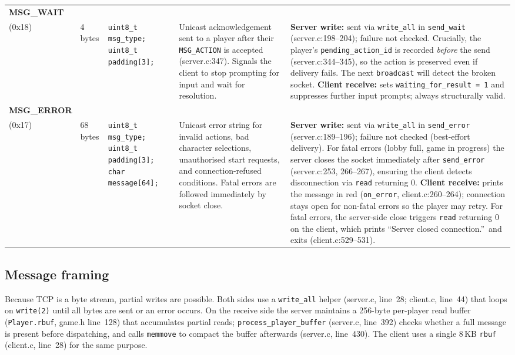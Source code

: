 \documentclass[11pt,letterpaper]{article}
\begin{document}
\begin{longtable}{@{}p{1.8cm} p{1.2cm} p{2.4cm} p{4.2cm} p{4.8cm}@{}}
\textbf{MSG\_WAIT}\\(0x18) &
4 bytes &
\texttt{uint8\_t msg\_type;}\newline
\texttt{uint8\_t padding[3];} &
Unicast acknowledgement sent to a player after their \texttt{MSG\_ACTION} is accepted (server.c:347). Signals the client to stop prompting for input and wait for resolution. &
\textbf{Server write:} sent via \texttt{write\_all} in \texttt{send\_wait} (server.c:198--204); failure not checked. Crucially, the player's \texttt{pending\_action\_id} is recorded \emph{before} the send (server.c:344--345), so the action is preserved even if delivery fails. The next \texttt{broadcast} will detect the broken socket. \textbf{Client receive:} sets \texttt{waiting\_for\_result = 1} and suppresses further input prompts; always structurally valid. \\[4pt]

\textbf{MSG\_ERROR}\\(0x17) &
68 bytes &
\texttt{uint8\_t msg\_type;}\newline
\texttt{uint8\_t padding[3];}\newline
\texttt{char message[64];} &
Unicast error string for invalid actions, bad character selections, unauthorised start requests, and connection-refused conditions. Fatal errors are followed immediately by socket close. &
\textbf{Server write:} sent via \texttt{write\_all} in \texttt{send\_error} (server.c:189--196); failure not checked (best-effort delivery). For fatal errors (lobby full, game in progress) the server closes the socket immediately after \texttt{send\_error} (server.c:253, 266--267), ensuring the client detects disconnection via \texttt{read} returning 0. \textbf{Client receive:} prints the message in red (\texttt{on\_error}, client.c:260--264); connection stays open for non-fatal errors so the player may retry. For fatal errors, the server-side close triggers \texttt{read} returning 0 on the client, which prints ``Server closed connection.''\ and exits (client.c:529--531). \\
\bottomrule
\end{longtable}
\endgroup

\subsection*{Message framing}

Because TCP is a byte stream, partial writes are possible. Both sides use a \texttt{write\_all} helper (server.c, line~28; client.c, line~44) that loops on \texttt{write(2)} until all bytes are sent or an error occurs. On the receive side the server maintains a 256-byte per-player read buffer (\texttt{Player.rbuf}, game.h line~128) that accumulates partial reads; \texttt{process\_player\_buffer} (server.c, line~392) checks whether a full message is present before dispatching, and calls \texttt{memmove} to compact the buffer afterwards (server.c, line~430). The client uses a single 8\,KB \texttt{rbuf} (client.c, line~28) for the same purpose.
\end{document}
